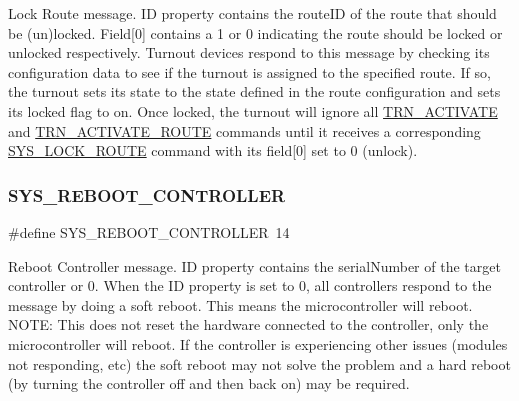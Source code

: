 Lock Route message. ID property contains the route\+ID of the route that should be (un)locked. Field\mbox{[}0\mbox{]} contains a 1 or 0 indicating the route should be locked or unlocked respectively. Turnout devices respond to this message by checking its configuration data to see if the turnout is assigned to the specified route. If so, the turnout sets its state to the state defined in the route configuration and sets its locked flag to on. Once locked, the turnout will ignore all \hyperlink{group___u_d_p_message_i_d_gab5a0eacfbf0cfab134534d10890d5c25}{T\+R\+N\+\_\+\+A\+C\+T\+I\+V\+A\+TE} and \hyperlink{group___u_d_p_message_i_d_ga44d53121d88631ed14d77f8b6a405816}{T\+R\+N\+\_\+\+A\+C\+T\+I\+V\+A\+T\+E\+\_\+\+R\+O\+U\+TE} commands until it receives a corresponding \hyperlink{group___u_d_p_message_i_d_ga9ba07526db57f9ec44d01fe3eba9cc60}{S\+Y\+S\+\_\+\+L\+O\+C\+K\+\_\+\+R\+O\+U\+TE} command with its field\mbox{[}0\mbox{]} set to 0 (unlock). \mbox{\label{group___u_d_p_message_i_d_gae5a140537bdeb16c6f8ac38ee7a841f6}} 
\subsubsection{\texorpdfstring{S\+Y\+S\+\_\+\+R\+E\+B\+O\+O\+T\+\_\+\+C\+O\+N\+T\+R\+O\+L\+L\+ER}{SYS\_REBOOT\_CONTROLLER}}
{\footnotesize\ttfamily \#define S\+Y\+S\+\_\+\+R\+E\+B\+O\+O\+T\+\_\+\+C\+O\+N\+T\+R\+O\+L\+L\+ER~14}

Reboot Controller message. ID property contains the serial\+Number of the target controller or 0. When the ID property is set to 0, all controllers respond to the message by doing a soft reboot. This means the microcontroller will reboot. N\+O\+TE\+: This does not reset the hardware connected to the controller, only the microcontroller will reboot. If the controller is experiencing other issues (modules not responding, etc) the soft reboot may not solve the problem and a hard reboot (by turning the controller off and then back on) may be required. \mbox{\label{group___u_d_p_message_i_d_ga30863a10d0fcf12b2664d572864c4e0f}} 
